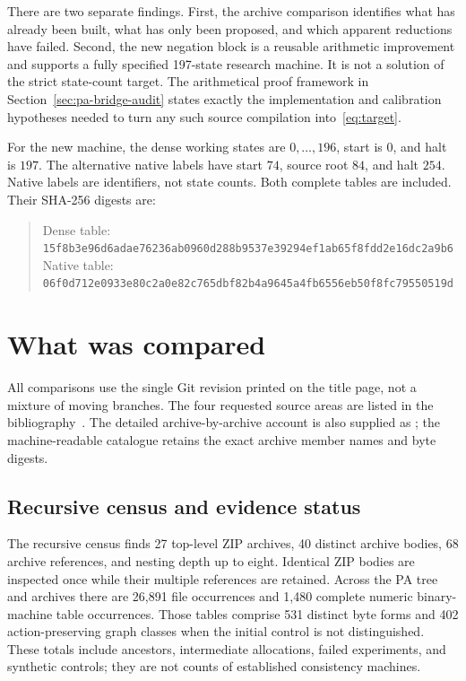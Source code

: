 \documentclass[11pt,a4paper]{article}
\newcommand{\code}[1]{\texttt{\detokenize{#1}}}
\begin{document}
There are two separate findings. First, the archive comparison identifies
what has already been built, what has only been proposed, and which apparent
reductions have failed. Second, the new negation block is a reusable
arithmetic improvement and supports a fully specified 197-state research
machine. It is not a solution of the strict state-count target. The
arithmetical proof framework in Section~\ref{sec:pa-bridge-audit} states
exactly the implementation and calibration hypotheses needed to turn any
such source compilation into~\eqref{eq:target}.

For the new machine, the dense working states are $0,\ldots,196$, start is
$0$, and halt is $197$. The alternative native labels have start $74$,
source root $84$, and halt $254$. Native labels are identifiers, not state
counts. Both complete tables are included. Their SHA-256 digests are:
\begin{quote}\small
Dense table:\\
\nolinkurl{15f8b3e96d6adae76236ab0960d288b9537e39294ef1ab65f8fdd2e16dc2a9b6}\\
Native table:\\
\nolinkurl{06f0d712e0933e80c2a0e82c765dbf82b4a9645a4fb6556eb50f8fc79550519d}
\end{quote}

\section{What was compared}

All comparisons use the single Git revision printed on the title page,
not a mixture of moving branches. The four requested source areas are
listed in the bibliography~\cite{repo-pa,repo-incoming,repo-zfc,repo-ipra}.
The detailed archive-by-archive account is also supplied as
\code{audit/ARCHIVE_COMPARISON.md}; the machine-readable catalogue retains
the exact archive member names and byte digests.

\subsection{Recursive census and evidence status}

The recursive census finds 27 top-level ZIP archives, 40 distinct archive
bodies, 68 archive references, and nesting depth up to eight. Identical ZIP
bodies are inspected once while their multiple references are retained.
Across the PA tree and archives there are 26,891 file occurrences and 1,480
complete numeric binary-machine table occurrences. Those tables comprise
531 distinct byte forms and 402 action-preserving graph classes when the
initial control is not distinguished. These totals include ancestors,
intermediate allocations, failed experiments, and synthetic controls;
they are not counts of established consistency machines.
\end{document}
